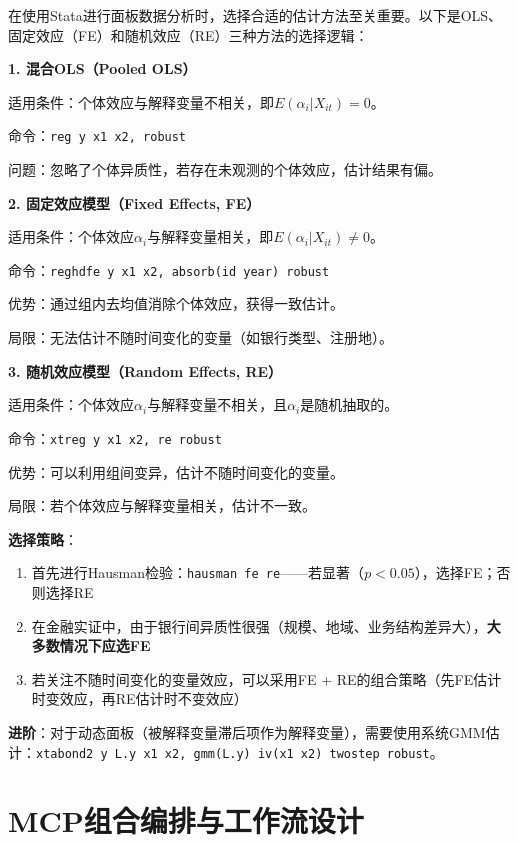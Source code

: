 \begin{theorybox}[面板数据回归方法选择指南]
在使用Stata进行面板数据分析时，选择合适的估计方法至关重要。以下是OLS、固定效应（FE）和随机效应（RE）三种方法的选择逻辑：

\textbf{1. 混合OLS（Pooled OLS）}

适用条件：个体效应与解释变量不相关，即$E(\alpha_i | X_{it}) = 0$。

命令：\texttt{reg y x1 x2, robust}

问题：忽略了个体异质性，若存在未观测的个体效应，估计结果有偏。

\textbf{2. 固定效应模型（Fixed Effects, FE）}

适用条件：个体效应$\alpha_i$与解释变量相关，即$E(\alpha_i | X_{it}) \neq 0$。

命令：\texttt{reghdfe y x1 x2, absorb(id year) robust}

优势：通过组内去均值消除个体效应，获得一致估计。

局限：无法估计不随时间变化的变量（如银行类型、注册地）。

\textbf{3. 随机效应模型（Random Effects, RE）}

适用条件：个体效应$\alpha_i$与解释变量不相关，且$\alpha_i$是随机抽取的。

命令：\texttt{xtreg y x1 x2, re robust}

优势：可以利用组间变异，估计不随时间变化的变量。

局限：若个体效应与解释变量相关，估计不一致。

\textbf{选择策略}：

\begin{enumerate}
  \item 首先进行Hausman检验：\texttt{hausman fe re}——若显著（$p < 0.05$），选择FE；否则选择RE
  \item 在金融实证中，由于银行间异质性很强（规模、地域、业务结构差异大），\textbf{大多数情况下应选FE}
  \item 若关注不随时间变化的变量效应，可以采用FE + RE的组合策略（先FE估计时变效应，再RE估计时不变效应）
\end{enumerate}

\textbf{进阶}：对于动态面板（被解释变量滞后项作为解释变量），需要使用系统GMM估计：\texttt{xtabond2 y L.y x1 x2, gmm(L.y) iv(x1 x2) twostep robust}。
\end{theorybox}

\section{MCP组合编排与工作流设计}

